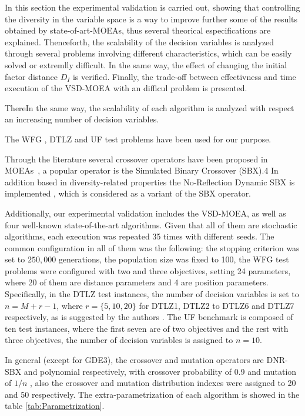 In this section the experimental validation is carried out, showing that controlling the diversity in the variable space is a way to improve further some of the results obtained by state-of-art-MOEAs, thus several theorical especifications are explained.
%
Thenceforth, the scalability of the decision variables is analyzed through several problems involving different characteristics, which can be easily solved or extremlly difficult.
%
In the same way, the effect of changing the initial factor distance $D_I$ is verified.
%
Finally, the trade-off between effectivness and time execution of the VSD-MOEA with an difficul problem is presented.

%
ThereIn the same way, the scalability of each algorithm is analyzed with respect an increasing number of decision variables.

%
The WFG \cite{Joel:WFG}, DTLZ \cite{Joel:DTLZ}  and UF \cite{Joel:CEC2009}  test problems have been used for our purpose. 
%

Through the literature several crossover operators have been proposed in MOEAs~\cite{Joel:ParentMeanCentricSelfAdaptation},  
a popular operator is the Simulated Binary Crossover (SBX).4\cite{Joel:SBX1994}%
%	
In addition based in diversity-related properties the No-Reflection Dynamic SBX is implemented \cite{Joel:DNR_SBX}, which is considered as a variant of the SBX operator.


%
Additionally, our experimental validation includes the VSD-MOEA, as well as four well-known state-of-the-art algorithms.
%
Given that all of them are stochastic algorithms, each execution was repeated 35 times with different seeds.
%
The common configuration in all of them was the following: the stopping criterion was set to $250,000$ generations, the population size was fixed to 100, the WFG test problems were configured with two and three objectives, setting 24 parameters, where 20 of them are distance parameters and 4 are position parameters.
%
Specifically, in the DTLZ test instances, the number of decision variables is set to $n=M+r-1$, where $r=\{5, 10, 20\}$ for DTLZ1, DTLZ2 to DTLZ6 and DTLZ7 respectively, as is suggested by the authors \cite{Joel:DTLZ}.  
% 
The UF benchmark is composed of ten test instances, where the first seven are of two objectives and the rest with three objectives, the number of decision variables is assigned to $n=10$.

%
In general (except for GDE3), the crossover and mutation operators are DNR-SBX and polynomial respectively, with crossover probability of 0.9 and mutation of $1/n$  \cite{Joel:Mutation}, also the crossover and mutation distribution indexes were assigned to 20 and 50 respectively.
%
The extra-parametrization of each algorithm is showed in the table \ref{tab:Parametrization}.
%

